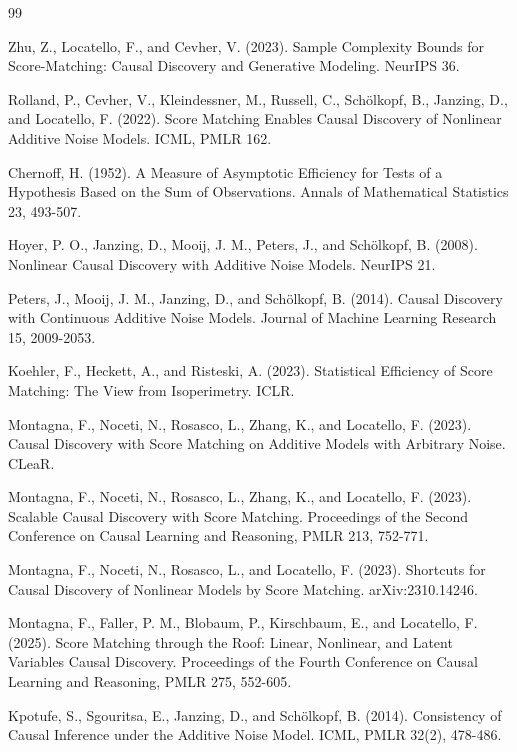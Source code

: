 \documentclass{article}
\begin{document}
\begin{thebibliography}{99}

   Zhu, Z., Locatello, F., and Cevher, V. (2023). Sample Complexity Bounds for Score-Matching: Causal Discovery and Generative Modeling. NeurIPS 36.

   Rolland, P., Cevher, V., Kleindessner, M., Russell, C., Schölkopf, B., Janzing, D., and Locatello, F. (2022). Score Matching Enables Causal Discovery of Nonlinear Additive Noise Models. ICML, PMLR 162.

   Chernoff, H. (1952). A Measure of Asymptotic Efficiency for Tests of a Hypothesis Based on the Sum of Observations. Annals of Mathematical Statistics 23, 493-507.

   Hoyer, P. O., Janzing, D., Mooij, J. M., Peters, J., and Schölkopf, B. (2008). Nonlinear Causal Discovery with Additive Noise Models. NeurIPS 21.

   Peters, J., Mooij, J. M., Janzing, D., and Schölkopf, B. (2014). Causal Discovery with Continuous Additive Noise Models. Journal of Machine Learning Research 15, 2009-2053.

   Koehler, F., Heckett, A., and Risteski, A. (2023). Statistical Efficiency of Score Matching: The View from Isoperimetry. ICLR.

   Montagna, F., Noceti, N., Rosasco, L., Zhang, K., and Locatello, F. (2023). Causal Discovery with Score Matching on Additive Models with Arbitrary Noise. CLeaR.

   Montagna, F., Noceti, N., Rosasco, L., Zhang, K., and Locatello, F. (2023). Scalable Causal Discovery with Score Matching. Proceedings of the Second Conference on Causal Learning and Reasoning, PMLR 213, 752-771.

   Montagna, F., Noceti, N., Rosasco, L., and Locatello, F. (2023). Shortcuts for Causal Discovery of Nonlinear Models by Score Matching. arXiv:2310.14246.

   Montagna, F., Faller, P. M., Blobaum, P., Kirschbaum, E., and Locatello, F. (2025). Score Matching through the Roof: Linear, Nonlinear, and Latent Variables Causal Discovery. Proceedings of the Fourth Conference on Causal Learning and Reasoning, PMLR 275, 552-605.

   Kpotufe, S., Sgouritsa, E., Janzing, D., and Schölkopf, B. (2014). Consistency of Causal Inference under the Additive Noise Model. ICML, PMLR 32(2), 478-486.

\end{thebibliography}
\end{document}
